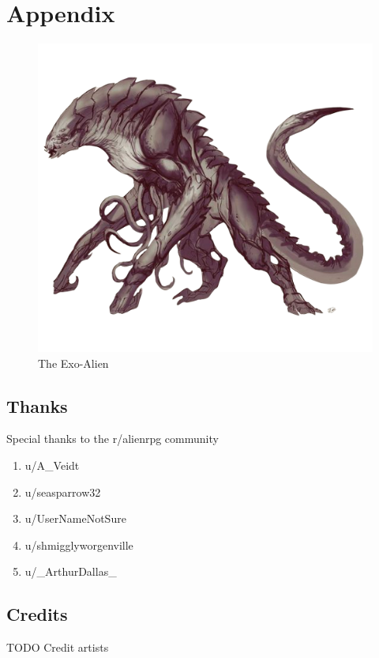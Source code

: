 \chapter{Appendix}

  


\begin{figure}
    \centering
    \includegraphics[width=.8\textwidth]{img/stage-III-bg.png}
    \caption*{The Exo-Alien}
\end{figure}


\clearpage



\clearpage



\clearpage



\clearpage


\section{Thanks}

\begin{rpg-commentbox}{Special thanks to the r/alienrpg community}
    
    \begin{enumerate}
        \item u/A\_Veidt
        \item u/seasparrow32
        \item u/UserNameNotSure
        \item u/shmigglyworgenville
        \item u/\_ArthurDallas\_
    \end{enumerate}
\end{rpg-commentbox} 

\section{Credits}

\begin{rpg-warnbox}{TODO}
    Credit artists
\end{rpg-warnbox}

